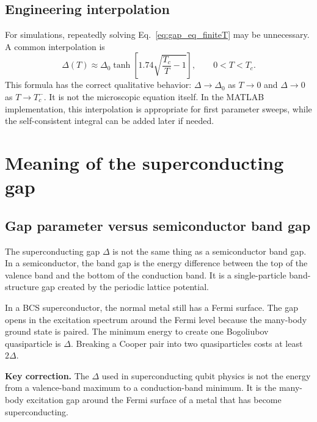 \documentclass[11pt]{article}
\begin{document}
\subsection{Engineering interpolation}
For simulations, repeatedly solving Eq.~\eqref{eq:gap_eq_finiteT} may be unnecessary. A common interpolation is
\begin{equation}
\Delta(T)\approx\Delta_0\tanh\left[1.74\sqrt{\frac{T_c}{T}-1}\right],\qquad 0<T<T_c.
\end{equation}
This formula has the correct qualitative behavior: $\Delta\to\Delta_0$ as $T\to0$ and $\Delta\to0$ as $T\to T_c^-$. It is not the microscopic equation itself. In the MATLAB implementation, this interpolation is appropriate for first parameter sweeps, while the self-consistent integral can be added later if needed.

\section{Meaning of the superconducting gap}

\subsection{Gap parameter versus semiconductor band gap}
The superconducting gap $\Delta$ is not the same thing as a semiconductor band gap. In a semiconductor, the band gap is the energy difference between the top of the valence band and the bottom of the conduction band. It is a single-particle band-structure gap created by the periodic lattice potential.

In a BCS superconductor, the normal metal still has a Fermi surface. The gap opens in the excitation spectrum around the Fermi level because the many-body ground state is paired. The minimum energy to create one Bogoliubov quasiparticle is $\Delta$. Breaking a Cooper pair into two quasiparticles costs at least $2\Delta$.

\begin{physicsbox}
\textbf{Key correction.} The $\Delta$ used in superconducting qubit physics is not the energy from a valence-band maximum to a conduction-band minimum. It is the many-body excitation gap around the Fermi surface of a metal that has become superconducting.
\end{physicsbox}
\end{document}
